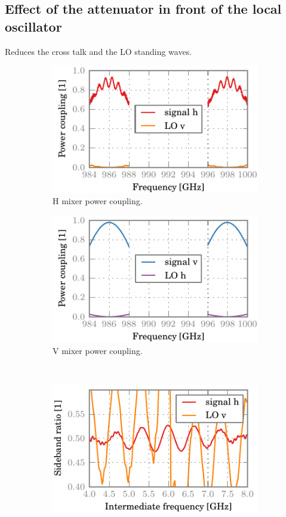 \clearpage
\subsection{Effect of the attenuator in front of the local oscillator}
Reduces the cross talk and the LO standing waves.

\begin{figure}[hbtp]
    \centering
    \begin{subfigure}[b]{.5\textwidth}
        \includegraphics{chapter_3/13_lor_att10_h_dsb}%
        \caption{H mixer power coupling.}
    \end{subfigure}%
    \begin{subfigure}[b]{.5\textwidth}
        \includegraphics{chapter_3/13_lor_att10_v_dsb}%
        \caption{V mixer power coupling.}
    \end{subfigure}%
    \\
    \begin{subfigure}[b]{.5\textwidth}
        \includegraphics{chapter_3/13_lor_att10_h_sbr}%

\end{subfigure}
\end{figure}
